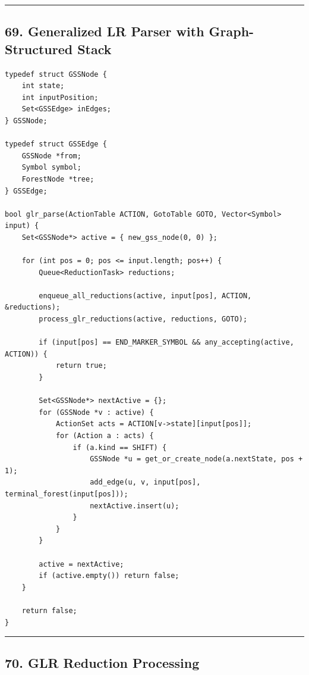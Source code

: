 \documentclass[10pt,letterpaper]{article}
\begin{document}
\medskip\hrule\medskip

\subsection*{69. Generalized LR Parser with Graph-Structured Stack}

\begin{verbatim}
typedef struct GSSNode {
    int state;
    int inputPosition;
    Set<GSSEdge> inEdges;
} GSSNode;

typedef struct GSSEdge {
    GSSNode *from;
    Symbol symbol;
    ForestNode *tree;
} GSSEdge;

bool glr_parse(ActionTable ACTION, GotoTable GOTO, Vector<Symbol> input) {
    Set<GSSNode*> active = { new_gss_node(0, 0) };

    for (int pos = 0; pos <= input.length; pos++) {
        Queue<ReductionTask> reductions;

        enqueue_all_reductions(active, input[pos], ACTION, &reductions);
        process_glr_reductions(active, reductions, GOTO);

        if (input[pos] == END_MARKER_SYMBOL && any_accepting(active, ACTION)) {
            return true;
        }

        Set<GSSNode*> nextActive = {};
        for (GSSNode *v : active) {
            ActionSet acts = ACTION[v->state][input[pos]];
            for (Action a : acts) {
                if (a.kind == SHIFT) {
                    GSSNode *u = get_or_create_node(a.nextState, pos + 1);
                    add_edge(u, v, input[pos], terminal_forest(input[pos]));
                    nextActive.insert(u);
                }
            }
        }

        active = nextActive;
        if (active.empty()) return false;
    }

    return false;
}
\end{verbatim}

\medskip\hrule\medskip

\subsection*{70. GLR Reduction Processing}
\end{document}
